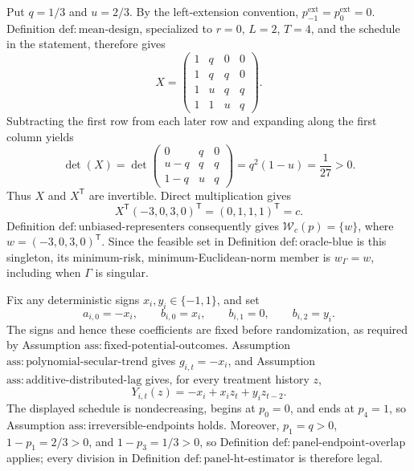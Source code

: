Put \(q=1/3\) and \(u=2/3\).  By the left-extension convention, \(p^{\mathrm{ext}}_{-1}=p^{\mathrm{ext}}_0=0\).  Definition \(\mathrm{def:mean\text{-}design}\), specialized to \(r=0\), \(L=2\), \(T=4\), and the schedule in the statement, therefore gives
\[
X=
\begin{pmatrix}
1&q&0&0\\
1&q&q&0\\
1&u&q&q\\
1&1&u&q
\end{pmatrix}.
\]
Subtracting the first row from each later row and expanding along the first column yields
\[
\det(X)
=\det\!\begin{pmatrix}
0&q&0\\
u-q&q&q\\
1-q&u&q
\end{pmatrix}
=q^2(1-u)=\frac1{27}>0.
\]
Thus \(X\) and \(X^{\mathsf T}\) are invertible.  Direct multiplication gives
\[
X^{\mathsf T}(-3,0,3,0)^{\mathsf T}
=(0,1,1,1)^{\mathsf T}=c.
\]
Definition \(\mathrm{def:unbiased\text{-}representers}\) consequently gives
\(\mathcal W_c(p)=\{w\}\), where \(w=(-3,0,3,0)^{\mathsf T}\).  Since the feasible set in Definition \(\mathrm{def:oracle\text{-}blue}\) is this singleton, its minimum-risk, minimum-Euclidean-norm member is \(w_\Gamma=w\), including when \(\Gamma\) is singular.

Fix any deterministic signs \(x_i,y_i\in\{-1,1\}\), and set
\[
a_{i,0}=-x_i,\qquad b_{i,0}=x_i,\qquad b_{i,1}=0,
\qquad b_{i,2}=y_i.
\tag{1}
\]
The signs and hence these coefficients are fixed before randomization, as required by Assumption \(\mathrm{ass:fixed\text{-}potential\text{-}outcomes}\).  Assumption \(\mathrm{ass:polynomial\text{-}secular\text{-}trend}\) gives \(g_{i,t}=-x_i\), and Assumption \(\mathrm{ass:additive\text{-}distributed\text{-}lag}\) gives, for every treatment history \(z\),
\[
Y_{i,t}(z)=-x_i+x_i z_t+y_i z_{t-2}.
\tag{2}
\]
The displayed schedule is nondecreasing, begins at \(p_0=0\), and ends at \(p_4=1\), so Assumption \(\mathrm{ass:irreversible\text{-}endpoints}\) holds.  Moreover, \(p_1=q>0\), \(1-p_1=2/3>0\), and \(1-p_3=1/3>0\), so Definition \(\mathrm{def:panel\text{-}endpoint\text{-}overlap}\) applies; every division in Definition \(\mathrm{def:panel\text{-}ht\text{-}estimator}\) is therefore legal.


